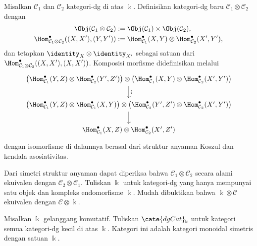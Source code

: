 \begin{definition}\label{def:dgCat-tensor}
	Misalkan $\mathcal{C}_1$ dan $\mathcal{C}_2$ kategori-dg di atas $\Bbbk$.
	Definisikan kategori-dg baru $\mathcal{C}_1\otimes\mathcal{C}_2$ dengan
	\begin{align*}
		\Obj(\mathcal{C}_1 \otimes \mathcal{C}_2) & := \Obj(\mathcal{C}_1) \times \Obj(\mathcal{C}_2), \\
		\Hom_{\mathcal{C}_1 \otimes \mathcal{C}_2}^\bullet((X, X'), (Y, Y')) & := \Hom_{\mathcal{C}_1}^\bullet(X, Y) \otimes \Hom_{\mathcal{C}_2}^\bullet(X', Y'),
	\end{align*}
	dan tetapkan $\identity_X\otimes\identity_{X'}$ sebagai satuan dari
	$\Hom_{\mathcal{C}_1\otimes\mathcal{C}_2}^\bullet((X,X'),(X,X'))$.
	Komposisi morfisme didefinisikan melalui
	\[\begin{tikzcd}
		\left( \Hom_{\mathcal{C}_1}^\bullet(Y, Z) \otimes \Hom_{\mathcal{C}_2}^\bullet(Y', Z')\right) \otimes
		\left( \Hom_{\mathcal{C}_1}^\bullet(X, Y) \otimes \Hom_{\mathcal{C}_2}^\bullet(X', Y') \right) \arrow[d, "\sim" sloped] \\
		\left( \Hom_{\mathcal{C}_1}^\bullet(Y, Z) \otimes \Hom_{\mathcal{C}_1}^\bullet(X, Y) \right) \otimes
		\left( \Hom_{\mathcal{C}_2}^\bullet(Y', Z') \otimes \Hom_{\mathcal{C}_2}^\bullet(X', Y') \right) \arrow[d] \\
		\Hom_{\mathcal{C}_1}^\bullet(X, Z) \otimes \Hom_{\mathcal{C}_2}^\bullet(X', Z')
	\end{tikzcd}\]
	dengan isomorfisme di dalamnya berasal dari struktur anyaman Koszul dan
	kendala asosiativitas.
\end{definition}

Dari simetri struktur anyaman dapat diperiksa bahwa
$\mathcal{C}_1\otimes\mathcal{C}_2$ secara alami ekuivalen dengan
$\mathcal{C}_2\otimes\mathcal{C}_1$. Tuliskan $\Bbbk$ untuk kategori-dg yang
hanya mempunyai satu objek dan kompleks endomorfisme $\Bbbk$. Mudah
dibuktikan bahwa $\Bbbk\otimes\mathcal{C}$ ekuivalen dengan
$\mathcal{C}\otimes\Bbbk$.

\begin{definition}\label{def:dgCat-as-cat}
	Misalkan $\Bbbk$ gelanggang komutatif. Tuliskan $\cate{dgCat}_{\Bbbk}$
	untuk kategori semua kategori-dg kecil di atas $\Bbbk$. Kategori ini adalah
	kategori monoidal simetris dengan satuan $\Bbbk$.
\end{definition}


